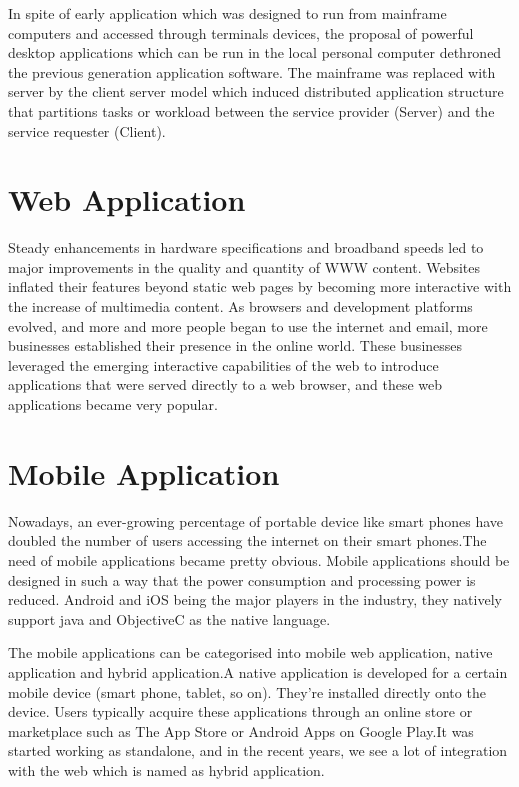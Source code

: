 			In spite of early application which was designed to run from mainframe computers and accessed through terminals devices, the proposal of powerful desktop applications which can be run in the local personal computer dethroned the previous generation application software. The mainframe was replaced with server by the client server model which induced distributed application structure that partitions tasks or workload between the service provider (Server) and the service requester (Client).  
			
\section{Web Application}
			
			Steady enhancements in hardware specifications and broadband speeds led to major improvements in the quality and quantity of WWW content. Websites inflated their features beyond static web pages by becoming more interactive with the increase of multimedia content. As browsers and development platforms evolved, and more and more people began to use the internet and email, more businesses established their presence in the online world. These businesses leveraged the emerging interactive capabilities of the web to introduce applications that were served directly to a web browser, and these web applications became very popular.

\section{Mobile Application}
			
			Nowadays, an ever-growing percentage of portable device like smart phones have doubled the number of users accessing the internet  on their smart phones.The need of mobile applications became pretty obvious. Mobile applications should be designed in such a way that the power consumption and processing power is reduced. Android and iOS being the major players in the industry, they natively support java and ObjectiveC as the native language. 
			
			The mobile applications can be categorised into mobile web application, native application and hybrid application.A native application is developed for a certain mobile device (smart phone, tablet, so on). They’re installed directly onto the device. Users typically acquire these applications through an online store or marketplace such as The App Store or Android Apps on Google Play.It was started working as standalone, and in the recent years, we see a lot of integration with the web which is named as hybrid application.


